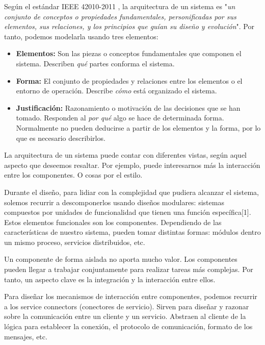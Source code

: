 Según el estándar IEEE 42010-2011 \cite{ieeeStandard420102011Systems2011}, la arquitectura de un sistema es "\textit{un conjunto de conceptos o propiedades fundamentales, personificadas por sus elementos, sus relaciones, y los principios que guían su diseño y evolución}". Por tanto, podemos modelarla usando tres elementos: \cite{perryFoundationsStudySoftware1992} 
    \begin{itemize}
        \item \textbf{Elementos:} Son las piezas o conceptos fundamentales que componen el sistema. Describen \textit{qué} partes conforma el sistema.
        
        \item \textbf{Forma:} El conjunto de propiedades y relaciones entre los elementos o el entorno de operación. Describe \textit{cómo} está organizado el sistema. 
        
        \item \textbf{Justificación:} Razonamiento o motivación de las decisiones que se han tomado. Responden al \textit{por qué} algo se hace de determinada forma. Normalmente no pueden deducirse a partir de los elementos y la forma, por lo que es necesario describirlos.
    \end{itemize}

La arquitectura de un sistema puede contar con diferentes vistas, según aquel aspecto que deseemos resaltar. Por ejemplo, puede interesarnos más la interacción entre los componentes. O cosas por el estilo.

Durante el diseño, para lidiar con la complejidad que pudiera alcanzar el sistema, solemos recurrir a descomponerlos usando diseños modulares: sistemas compuestos por unidades de funcionalidad que tienen una función específica[1]. Estos elementos funcionales son los componentes. Dependiendo de las características de nuestro sistema, pueden tomar distintas formas: módulos dentro un mismo proceso, servicios distribuidos, etc.

Un componente de forma aislada no aporta mucho valor. Los componentes pueden llegar a trabajar conjuntamente para realizar tareas más complejas. Por tanto, un aspecto clave es la integración y la interacción entre ellos. \cite{mehtaTaxonomySoftwareConnectors2000}

Para diseñar los mecanismos de interacción entre componentes, podemos recurrir a los service connectors (conectores de servicio). Sirven para diseñar y razonar sobre la comunicación entre un cliente y un servicio. Abstraen al cliente de la lógica para establecer la conexión, el protocolo de comunicación, formato de los mensajes, etc. 

